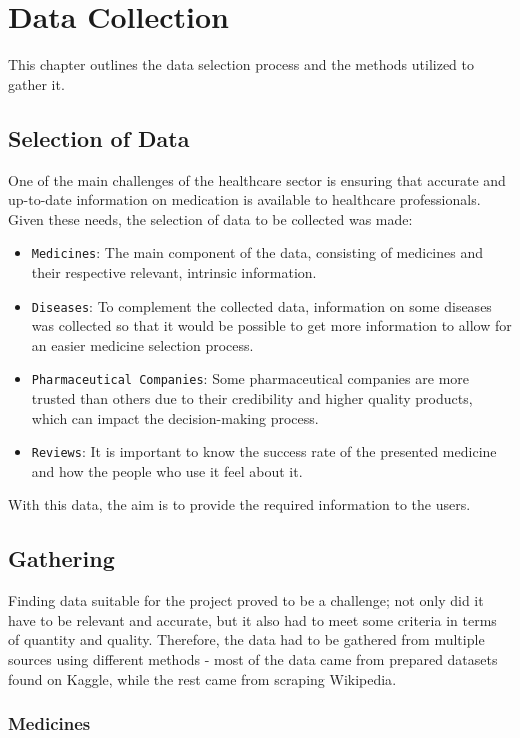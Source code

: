 \documentclass[sigconf]{acmart}
\begin{document}
\section{Data Collection}
This chapter outlines the data selection process and the methods utilized to gather it.

\subsection{Selection of Data}
One of the main challenges of the healthcare sector is ensuring that accurate and up-to-date information on medication is available to healthcare professionals. Given these needs, the selection of data to be collected was made:

\begin{itemize}
	\item {\texttt{Medicines}}: The main component of the data, consisting of medicines and their respective relevant, intrinsic information.
	\item {\texttt{Diseases}}: To complement the collected data, information on some diseases was collected so that it would be possible to get more information to allow for an easier medicine selection process.
	\item {\texttt{Pharmaceutical Companies}}: Some pharmaceutical companies are more trusted than others due to their credibility and higher quality products, which can impact the decision-making process.
	\item {\texttt{Reviews}}: It is important to know the success rate of the presented medicine and how the people who use it feel about it.
\end{itemize}

With this data, the aim is to provide the required information to the users.

\subsection{Gathering}

Finding data suitable for the project proved to be a challenge; not only did it have to be relevant and accurate, but it also had to meet some criteria in terms of quantity and quality. Therefore, the data had to be gathered from multiple sources using different methods - most of the data came from prepared datasets found on Kaggle\cite{kaggle}, while the rest came from scraping Wikipedia\cite{wikipedia}.

\subsubsection{Medicines}
\end{document}
